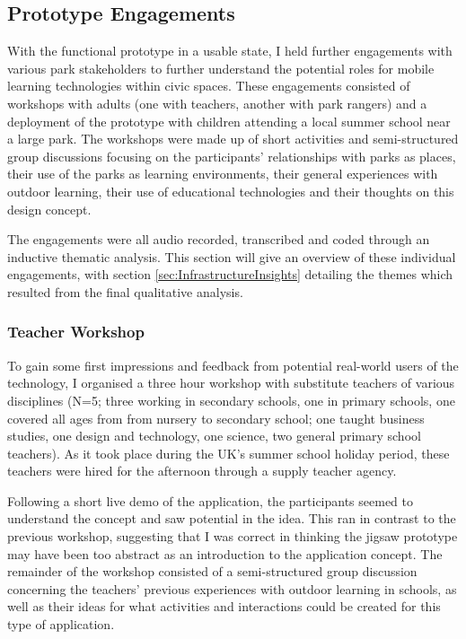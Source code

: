 \subsection{Prototype Engagements}

With the functional prototype in a usable state, I held further engagements with various park stakeholders to further understand the potential roles for mobile learning technologies within civic spaces. These engagements consisted of workshops with adults (one with teachers, another with park rangers) and a deployment of the prototype with children attending a local summer school near a large park. The workshops were made up of short activities and semi-structured group discussions focusing on the participants’ relationships with parks as places, their use of the parks as learning environments, their general experiences with outdoor learning, their use of educational technologies and their thoughts on this design concept.

The engagements were all audio recorded, transcribed and coded through an inductive thematic analysis. This section will give an overview of these individual engagements, with section \ref{sec:InfrastructureInsights} detailing the themes which resulted from the final qualitative analysis.  

\subsubsection{Teacher Workshop}

To gain some first impressions and feedback from potential real-world users of the technology, I organised a three hour workshop with substitute teachers of various disciplines (N=5; three working in secondary schools, one in primary schools, one covered all ages from from nursery to secondary school; one taught business studies, one design and technology, one science, two general primary school teachers). As it took place during the UK's summer school holiday period, these teachers were hired for the afternoon through a supply teacher agency. 

Following a short live demo of the application, the participants seemed to understand the concept and saw potential in the idea. This ran in contrast to the previous workshop, suggesting that I was correct in thinking the jigsaw prototype may have been too abstract as an introduction to the application concept. The remainder of the workshop consisted of a semi-structured group discussion concerning the teachers' previous experiences with outdoor learning in schools, as well as their ideas for what activities and interactions could be created for this type of application.

